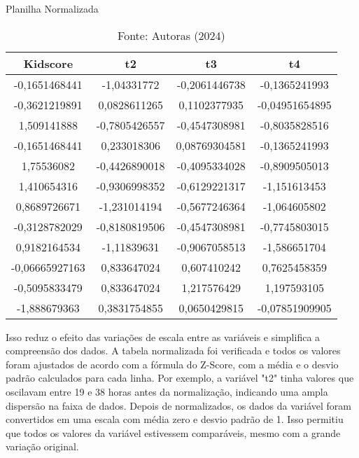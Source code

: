 \begin{table}[h!]
  \centering
  \renewcommand{\arraystretch}{1.2} 
  \captionsetup{font=footnotesize, justification=centering, labelsep=period, position=above}
  \caption{Planilha Normalizada}
  \label{tab:normalizacao}
  \begin{tabular}{|c|c|c|c|}
      \vspace{0.2cm} \cellcolor[HTML]{008940}  \textbf{Kidscore} & \cellcolor[HTML]{008940} \textbf{t2} & \cellcolor[HTML]{008940}  \textbf{t3} & \cellcolor[HTML]{008940}  \textbf{t4} \\
      
      \hline
      -0,1651468441 & -1,04331772 & -0,2061446738 & -0,1365241993 \\
      -0,3621219891 & 0,0828611265 & 0,1102377935 & -0,04951654895 \\
      1,509141888 & -0,7805426557 & -0,4547308981 & -0,8035828516 \\
      -0,1651468441 & 0,233018306 & 0,08769304581 & -0,1365241993 \\
      1,75536082 & -0,4426890018 & -0,4095334028 & -0,8909505013 \\
      1,410654316 & -0,9306998352 & -0,6129221317 & -1,151613453 \\
      0,8689726671 & -1,231014194 & -0,5677246364 & -1,064605802 \\
      -0,3128782029 & -0,8180819506 & -0,4547308981 & -0,7745803015 \\
      0,9182164534 & -1,11839631 & -0,9067058513 & -1,586651704 \\
      -0,06665927163 & 0,833647024 & 0,607410242 & 0,7625458359 \\
      -0,5095833479 & 0,833647024 & 1,217576429 & 1,197593105 \\
      -1,888679363 & 0,3831754855 & 0,0650429815 & -0,07851909905 \\
      \hline
  \end{tabular}
  \caption*{\scriptsize Fonte: Autoras (2024)}
\end{table}
\FloatBarrier

Isso reduz o efeito das variações de escala entre as variáveis e simplifica a compreensão dos dados. A tabela normalizada foi verificada e todos os valores foram ajustados de acordo com a fórmula do Z-Score, com a média e o desvio padrão calculados para cada linha. Por exemplo, a variável "t2" tinha valores que oscilavam entre 19 e 38 horas antes da normalização, indicando uma ampla dispersão na faixa de dados. Depois de normalizados, os dados da variável foram convertidos em uma escala com média zero e desvio padrão de 1. Isso permitiu que todos os valores da variável estivessem comparáveis, mesmo com a grande variação original.

